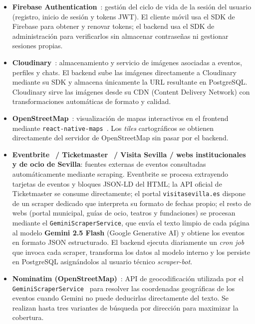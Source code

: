 \begin{itemize}
    \item \textbf{Firebase Authentication}~\cite{firebase}: gestión del ciclo de vida de la sesión del usuario (registro, inicio de sesión y tokens JWT). El cliente móvil usa el SDK de Firebase para obtener y renovar tokens; el backend usa el SDK de administración para verificarlos sin almacenar contraseñas ni gestionar sesiones propias.
    \item \textbf{Cloudinary}~\cite{cloudinary}: almacenamiento y servicio de imágenes asociadas a eventos, perfiles y chats. El backend sube las imágenes directamente a Cloudinary mediante su SDK y almacena únicamente la URL resultante en PostgreSQL. Cloudinary sirve las imágenes desde su CDN (Content Delivery Network) con transformaciones automáticas de formato y calidad.
    \item \textbf{OpenStreetMap}~\cite{openstreetmap}: visualización de mapas interactivos en el frontend mediante \texttt{react-native-maps}~\cite{reactnativemaps}. Los \textit{tiles} cartográficos se obtienen directamente del servidor de OpenStreetMap sin pasar por el backend.
    \item \textbf{Eventbrite}~\cite{eventbrite} \textbf{/ Ticketmaster}~\cite{ticketmaster} \textbf{/ Visita Sevilla / webs institucionales y de ocio de Sevilla}: fuentes externas de eventos consultadas automáticamente mediante scraping. Eventbrite se procesa extrayendo tarjetas de eventos y bloques JSON-LD del HTML; la API oficial de Ticketmaster se consume directamente; el portal \texttt{visitasevilla.es} dispone de un scraper dedicado que interpreta su formato de fechas propio; el resto de webs (portal municipal, guías de ocio, teatros y fundaciones) se procesan mediante el \texttt{GeminiScraperService}, que envía el texto limpio de cada página al modelo \textbf{Gemini 2.5 Flash} (Google Generative AI) y obtiene los eventos en formato JSON estructurado. El backend ejecuta diariamente un \textit{cron job} que invoca cada scraper, transforma los datos al modelo interno y los persiste en PostgreSQL asignándolos al usuario técnico \textit{scraper-bot}.
\end{itemize}

\begin{itemize}
    \item \textbf{Nominatim (OpenStreetMap)}~\cite{nominatim}: API de geocodificación utilizada por el \texttt{GeminiScraperService}~\cite{gemini} para resolver las coordenadas geográficas de los eventos cuando Gemini no puede deducirlas directamente del texto. Se realizan hasta tres variantes de búsqueda por dirección para maximizar la cobertura.
\end{itemize}

